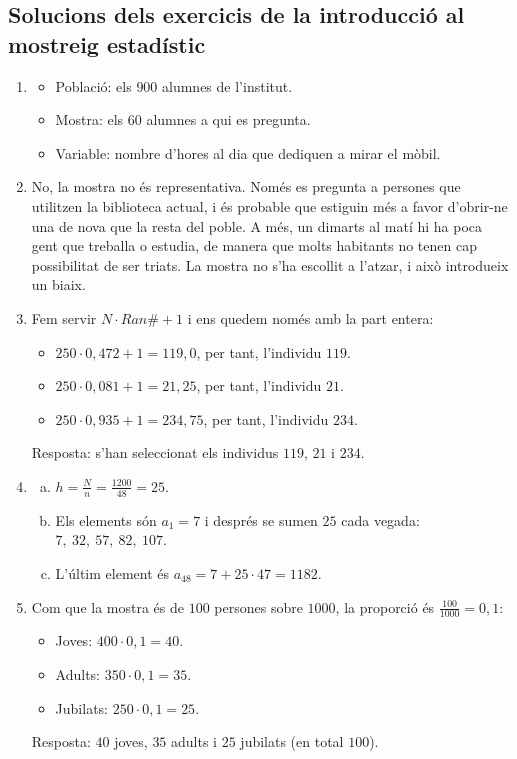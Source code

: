 \subsection{Solucions dels exercicis de la introducció al mostreig estadístic}
\begin{enumerate}
 \item
 \begin{itemize}
  \item Població: els $900$ alumnes de l'institut.
  \item Mostra: els $60$ alumnes a qui es pregunta.
  \item Variable: nombre d'hores al dia que dediquen a mirar el mòbil.
 \end{itemize}

 \item No, la mostra no és representativa. Només es pregunta a persones que utilitzen la biblioteca actual, i és probable que estiguin més a favor d'obrir-ne una de nova que la resta del poble. A més, un dimarts al matí hi ha poca gent que treballa o estudia, de manera que molts habitants no tenen cap possibilitat de ser triats. La mostra no s'ha escollit a l'atzar, i això introdueix un biaix.

 \item Fem servir $N\cdot Ran\#+1$ i ens quedem només amb la part entera:
 \begin{itemize}
  \item $250\cdot0{,}472+1=119{,}0$, per tant, l'individu $119$.
  \item $250\cdot0{,}081+1=21{,}25$, per tant, l'individu $21$.
  \item $250\cdot0{,}935+1=234{,}75$, per tant, l'individu $234$.
 \end{itemize}
 Resposta: s'han seleccionat els individus $119$, $21$ i $234$.

 \item
 \begin{enumerate}[a)]
  \item $h=\frac{N}{n}=\frac{1200}{48}=25$.
  \item Els elements són $a_1=7$ i després se sumen $25$ cada vegada: $7,\ 32,\ 57,\ 82,\ 107$.
  \item L'últim element és $a_{48}=7+25\cdot47=1182$.
 \end{enumerate}

 \item Com que la mostra és de $100$ persones sobre $1000$, la proporció és $\frac{100}{1000}=0{,}1$:
 \begin{itemize}
  \item Joves: $400\cdot0{,}1=40$.
  \item Adults: $350\cdot0{,}1=35$.
  \item Jubilats: $250\cdot0{,}1=25$.
 \end{itemize}
 Resposta: $40$ joves, $35$ adults i $25$ jubilats (en total $100$).


\end{enumerate}
